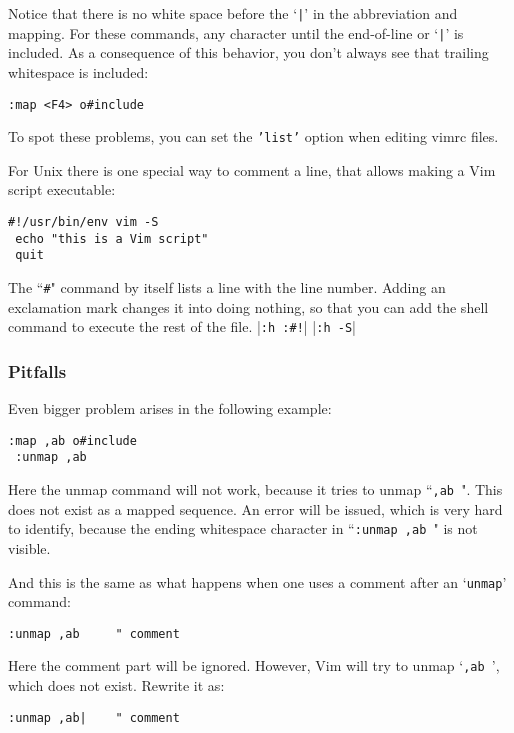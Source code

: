Notice that there is no white space before the `\texttt{|}' in the abbreviation and mapping.
For these commands, any character until the end-of-line or `\texttt{|}' is included.
As a consequence of this behavior, you don't always see that trailing whitespace is included:

\begin{Verbatim}[samepage=true]
 :map <F4> o#include
\end{Verbatim}

To spot these problems, you can set the \texttt{'list'} option when editing vimrc files.

For Unix there is one special way to comment a line, that allows making a Vim script executable:

\begin{Verbatim}[samepage=true]
 #!/usr/bin/env vim -S
 echo "this is a Vim script"
 quit
\end{Verbatim}

The ``\texttt{\#}" command by itself lists a line with the line number.
Adding an exclamation mark changes it into doing nothing, so that you can add the shell command to execute the rest of the file. |\texttt{:h :\#!}| |\texttt{:h -S}|

\subsubsection{Pitfalls}
Even bigger problem arises in the following example:

\begin{Verbatim}[samepage=true]
 :map ,ab o#include
 :unmap ,ab
\end{Verbatim}

Here the unmap command will not work, because it tries to unmap ``\texttt{,ab }".
This does not exist as a mapped sequence.
An error will be issued, which is very hard to identify, because the ending whitespace character in ``\texttt{:unmap ,ab }" is not visible.

And this is the same as what happens when one uses a comment after an `\texttt{unmap}' command:

\begin{Verbatim}[samepage=true]
 :unmap ,ab     " comment
\end{Verbatim}

Here the comment part will be ignored.
However, Vim will try to unmap `\texttt{,ab     }', which does not exist.
Rewrite it as:

\begin{Verbatim}[samepage=true]
 :unmap ,ab|    " comment
\end{Verbatim}


